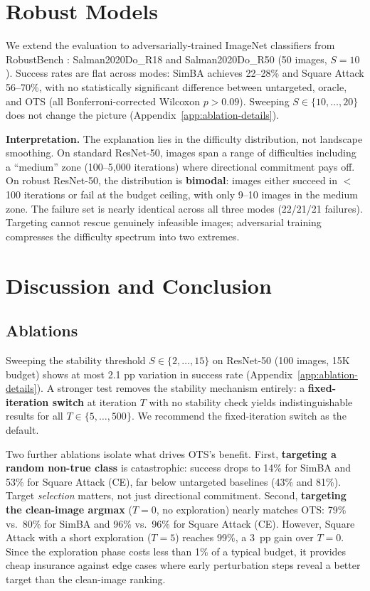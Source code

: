 \documentclass{cap2026}
\begin{document}
\section{Robust Models}\label{sec:robust}

We extend the evaluation to adversarially-trained ImageNet classifiers from RobustBench \citep{salman2020adversarially,croce2021robustbench}: Salman2020Do\_R18 and Salman2020Do\_R50 (50 images, $S=10$). Success rates are flat across modes: SimBA achieves 22--28\% and Square Attack 56--70\%, with no statistically significant difference between untargeted, oracle, and OTS (all Bonferroni-corrected Wilcoxon $p > 0.09$). Sweeping $S \in \{10, \ldots, 20\}$ does not change the picture (Appendix~\ref{app:ablation-details}).

\textbf{Interpretation.} The explanation lies in the difficulty distribution, not landscape smoothing. On standard ResNet-50, images span a range of difficulties including a ``medium'' zone (100--5,000 iterations) where directional commitment pays off. On robust ResNet-50, the distribution is \textbf{bimodal}: images either succeed in $<$100 iterations or fail at the budget ceiling, with only 9--10 images in the medium zone. The failure set is nearly identical across all three modes (22/21/21 failures). Targeting cannot rescue genuinely infeasible images; adversarial training compresses the difficulty spectrum into two extremes.

\section{Discussion and Conclusion}\label{sec:conclusion}

\subsection{Ablations}\label{sec:ablations}
Sweeping the stability threshold $S \in \{2, \ldots, 15\}$ on ResNet-50 (100 images, 15K budget) shows at most 2.1 pp variation in success rate (Appendix~\ref{app:ablation-details}). A stronger test removes the stability mechanism entirely: a \textbf{fixed-iteration switch} at iteration $T$ with no stability check yields indistinguishable results for all $T \in \{5, \ldots, 500\}$. We recommend the fixed-iteration switch as the default.

Two further ablations isolate what drives OTS's benefit. First, \textbf{targeting a random non-true class} is catastrophic: success drops to 14\% for SimBA and 53\% for Square Attack (CE), far below untargeted baselines (43\% and 81\%). Target \emph{selection} matters, not just directional commitment. Second, \textbf{targeting the clean-image argmax} ($T = 0$, no exploration) nearly matches OTS: 79\% vs.\ 80\% for SimBA and 96\% vs.\ 96\% for Square Attack (CE). However, Square Attack with a short exploration ($T = 5$) reaches 99\%, a 3~pp gain over $T = 0$. Since the exploration phase costs less than 1\% of a typical budget, it provides cheap insurance against edge cases where early perturbation steps reveal a better target than the clean-image ranking.
\end{document}
